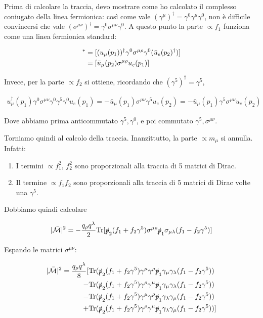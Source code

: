 \documentclass[11pt]{report}
\begin{document}
Prima di calcolare la traccia, devo mostrare come ho calcolato il complesso coniugato della linea fermionica: così come vale \((\gamma^\mu)^\dagger = \gamma^0 \gamma^\mu \gamma^0\), non è difficile convincersi che vale \((\sigma^{\mu\nu})^\dagger = \gamma^0 \sigma^{\mu\nu}\gamma^0\). A questo punto la parte \(\propto f_1\) funziona come una linea fermionica standard:

\begin{align}
    [\bar{u}_e(p_2)\sigma^{\mu\rho}u_\mu(p_1)]^* &= [(u_\mu(p_1))^\dagger \gamma^0 \sigma^{\mu\rho} \gamma^0 (\bar{u}_e (p_2)^\dagger)] \notag \\ 
    &= [\bar{u}_\mu(p_2)\sigma^{\mu\rho}u_e(p_1)]
\end{align}

Invece, per la parte \(\propto f_2\) si ottiene, ricordando che \((\gamma^5)^\dagger = \gamma^5\), 

\begin{align}
    u^\dagger_\mu(p_1)\gamma^0 \sigma^{\mu\nu}\gamma^0 \gamma^5 \gamma^0 u_e(p_1) = - \bar{u}_\mu(p_1)\sigma^{\mu\nu}\gamma^5 u_e(p_2) = -\bar{u}_\mu(p_1)\gamma^5\sigma^{\mu\nu} u_e(p_2) 
\end{align}

Dove abbiamo prima anticommutato \(\gamma^5, \gamma^0\), e poi commutato \(\gamma^5, \sigma^{\mu\nu}\). 

Torniamo quindi al calcolo della traccia. Inanzittutto, la parte \(\propto m_\mu\) si annulla. Infatti: 

\begin{enumerate}
    \item I termini \(\propto f_1^2, \, f_2^2\) sono proporzionali alla traccia di 5 matrici di Dirac. 
    \item Il termine \(\propto f_1 f_2\) sono proporzionali alla traccia di 5 matrici di Dirac volte una \(\gamma^5\). 
\end{enumerate}

Dobbiamo quindi calcolare 

\begin{align}
    |\mathcal{\bar{M}}|^2 = -\frac{q_\rho q^\lambda}{2}\text{Tr}[\slashed{p}_2(f_1+f_2\gamma^5)\sigma^{\mu\rho}\slashed{p}_1 \sigma_{\mu\lambda}(f_1-f_2\gamma^5) ]
\end{align}

Espando le matrici \(\sigma^{\mu\nu}\): 

\begin{align}
    |\mathcal{\bar{M}}|^2 = \frac{q_\rho q^\lambda}{8}[&\text{Tr}(\slashed{p}_2(f_1+f_2\gamma^5)\gamma^\mu \gamma^\rho \slashed{p}_1 \gamma_\mu \gamma_\lambda (f_1-f_2\gamma^5)) \notag \\ 
    -&\text{Tr}(\slashed{p}_2(f_1+f_2\gamma^5)\gamma^\rho \gamma^\mu \slashed{p}_1 \gamma_\mu \gamma_\lambda (f_1-f_2\gamma^5)) \notag \\ 
    -&\text{Tr}(\slashed{p}_2(f_1+f_2\gamma^5)\gamma^\mu \gamma^\rho \slashed{p}_1 \gamma_\lambda \gamma_\mu (f_1-f_2\gamma^5)) \notag \\  
    +&\text{Tr}(\slashed{p}_2(f_1+f_2\gamma^5)\gamma^\rho \gamma^\mu \slashed{p}_1 \gamma_\lambda \gamma_\mu (f_1-f_2\gamma^5))]
\end{align}
\end{document}
